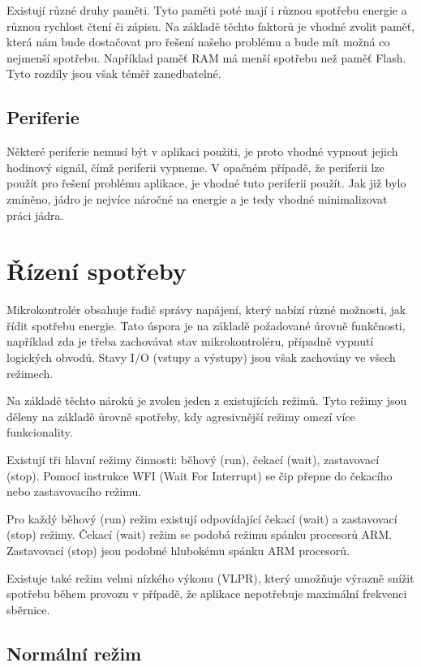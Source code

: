 \documentclass{article}
\begin{document}
Existují různé druhy paměti. Tyto paměti poté mají i různou spotřebu energie a
různou rychlost čtení či zápisu. Na základě těchto faktorů je vhodné zvolit
paměť, která nám bude dostačovat pro řešení našeho problému a bude mít možná co
nejmenší spotřebu. Například paměť RAM má menší spotřebu než paměť Flash. Tyto
rozdíly jsou však téměř zanedbatelné.

\subsection{Periferie}

Některé periferie nemusí být v aplikaci použiti, je proto vhodné vypnout jejich
hodinový signál, čímž periferii vypneme. V opačném případě, že periferii lze
použít pro řešení problému aplikace, je vhodné tuto periferii použít. Jak již
bylo zmíněno, jádro je nejvíce náročné na energie a je tedy vhodné
minimalizovat práci jádra.

\section{Řízení spotřeby}

Mikrokontrolér obsahuje řadič správy napájení, který nabízí různé možnosti, jak
řídit spotřebu energie. Tato úspora je na základě požadované úrovně funkčnosti,
například zda je třeba zachovávat stav mikrokontroléru, případně vypnutí
logických obvodů. Stavy I/O (vstupy a výstupy) jsou však zachovány ve všech
režimech.

Na základě těchto nároků je zvolen jeden z existujících režimů. Tyto režimy
jsou děleny na základě ůrovně spotřeby, kdy agresivnější režimy omezí více
funkcionality.

Existují tři hlavní režimy činnosti: běhový (run), čekací (wait), zastavovací
(stop). Pomocí instrukce WFI (Wait For Interrupt) se čip přepne do čekacího
nebo zastavovacího režimu.

Pro každý běhový (run) režim existují odpovídající čekací (wait) a zastavovací
(stop) režimy. Čekací (wait) režim se podobá režimu spánku procesorů ARM.
Zastavovací (stop) jsou podobné hlubokému spánku ARM procesorů.

Existuje také režim velmi nízkého výkonu (VLPR), který umožňuje výrazně snížit
spotřebu během provozu v případě, že aplikace nepotřebuje maximální frekvenci
sběrnice.

\subsection{Normální režim}
\end{document}
